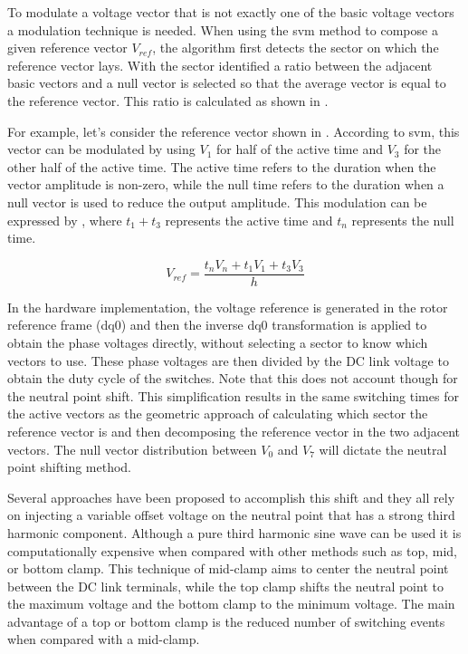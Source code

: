 To modulate a voltage vector that is not exactly one of the basic voltage vectors a modulation technique is needed. When using the \gls{svm} method to compose a given reference vector $V_{ref}$, the algorithm first detects the sector on which the reference vector lays. With the sector identified a ratio between the adjacent basic vectors and a null vector is selected so that the average vector is equal to the reference vector. This ratio is calculated as shown in .

For example, let's consider the reference vector shown in . According to \gls{svm}, this vector can be modulated by using $V_1$ for half of the active time and $V_3$ for the other half of the active time. The active time refers to the duration when the vector amplitude is non-zero, while the null time refers to the duration when a null vector is used to reduce the output amplitude. This modulation can be expressed by , where $t_1+t_3$ represents the active time and $t_{n}$ represents the null time.

\begin{equation}
	V_{ref} = \frac{t_{n} V_{n} + t_1 V_1  + t_3 V_3}{h}
	\label{eq:svm_vref}
\end{equation}



In the hardware implementation, the voltage reference is generated in the rotor reference frame (dq0) and then the inverse dq0 transformation is applied to obtain the phase voltages directly, without selecting a sector to know which vectors to use. These phase voltages are then divided by the DC link voltage to obtain the duty cycle of the switches. Note that this does not account though for the neutral point shift. This simplification results in the same switching times for the active vectors as the geometric approach of calculating which sector the reference vector is and then decomposing the reference vector in the two adjacent vectors. The null vector distribution between $V_0$ and $V_7$ will dictate the neutral point shifting method.

Several approaches have been proposed to accomplish this shift and they all rely on injecting a variable offset voltage on the neutral point that has a strong third harmonic component. Although a pure third harmonic sine wave can be used it is computationally expensive when compared with other methods such as top, mid, or bottom clamp. This technique of mid-clamp aims to center the neutral point between the DC link terminals, while the top clamp shifts the neutral point to the maximum voltage and the bottom clamp to the minimum voltage. The main advantage of a top or bottom clamp is the reduced number of switching events when compared with a mid-clamp. 

